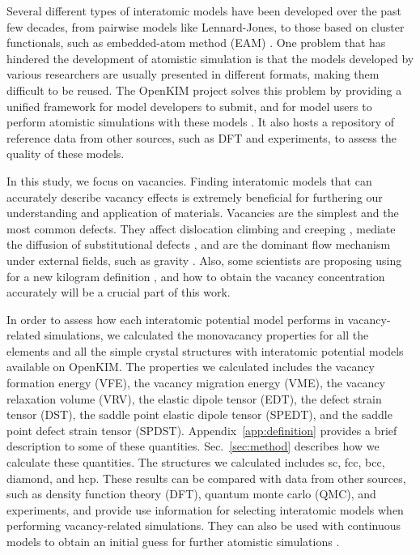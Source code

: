 \documentclass[%
 reprint,
 amsmath,amssymb,
 aps,
]{revtex4-1}
\begin{document}
Several different types of interatomic models have been developed over the past few decades, from pairwise models like Lennard-Jones, to those based on cluster functionals, such as embedded-atom method (EAM) \cite{daw1993embedded, daw1984embedded}.
One problem that has hindered the development of atomistic simulation is that the models developed by various researchers are usually presented in different formats, making them difficult to be reused.
The OpenKIM project \cite{bierbaum2014openkim, openkim2016} solves this problem by providing a unified framework for model developers to submit, and for model users to perform atomistic simulations with these models \cite{tadmor2011potential}.
It also hosts a repository of reference data from other sources, such as DFT and experiments, to assess the quality of these models.

In this study, we focus on vacancies.
Finding interatomic models that can accurately describe vacancy effects is extremely beneficial for furthering our understanding and application of materials.
Vacancies are the simplest and the most common defects.
They affect dislocation climbing and creeping \cite{weertman1955theory}, mediate the diffusion of substitutional defects \cite{fahey1989point}, and are the dominant flow mechanism under external fields, such as gravity \cite{sethna2014flow}.
Also, some scientists are proposing using  for a new kilogram definition \cite{andreas2011counting}, and how to obtain the vacancy concentration accurately will be a crucial part of this work.

In order to assess how each interatomic potential model performs in vacancy-related simulations, we calculated the monovacancy properties for all the elements and all the simple crystal structures with interatomic potential models available on OpenKIM.
The properties we calculated includes the vacancy formation energy (VFE), the vacancy migration energy (VME), the vacancy relaxation volume (VRV), the elastic dipole tensor (EDT), the defect strain tensor (DST), the saddle point elastic dipole tensor (SPEDT), and the saddle point defect strain tensor (SPDST).
Appendix~\ref{app:definition} provides a brief description to some of these quantities.
Sec.~\ref{sec:method} describes how we calculate these quantities.
The structures we calculated includes sc, fcc, bcc, diamond, and hcp.
These results can be compared with data from other sources, such as density function theory (DFT), quantum monte carlo (QMC), and experiments, and provide use information for selecting interatomic models when performing vacancy-related simulations.
They can also be used with continuous models to obtain an initial guess for further atomistic simulations \cite{bozhevolnyi2001multiple}.
\end{document}
